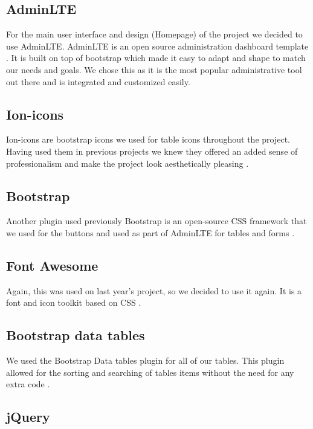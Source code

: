 \subsection{AdminLTE}

For the main user interface and design (Homepage) of the project we decided to use AdminLTE. AdminLTE is an open source administration dashboard template \cite{ADM}. It is built on top of bootstrap which made it easy to adapt and shape to match our needs and goals. We chose this as it is the most popular administrative tool out there and is integrated and customized easily.

\subsection{Ion-icons}

Ion-icons are bootstrap icons we used for table icons throughout the project. Having used them in previous projects we knew they offered an added sense of professionalism and make the project look aesthetically pleasing \cite{ION}. 

\subsection{Bootstrap}

Another plugin used previously Bootstrap is an open-source CSS framework that we used for the buttons and used as part of AdminLTE for tables and forms \cite{BTS}.

\subsection{Font Awesome}

Again, this was used on last year’s project, so we decided to use it again. It is a font and icon toolkit based on CSS \cite{FA}.

\subsection{Bootstrap data tables}

We used the Bootstrap Data tables plugin for all of our tables. This plugin allowed for the sorting and searching of tables items without the need for any extra code \cite{DT}.

\subsection{jQuery}


